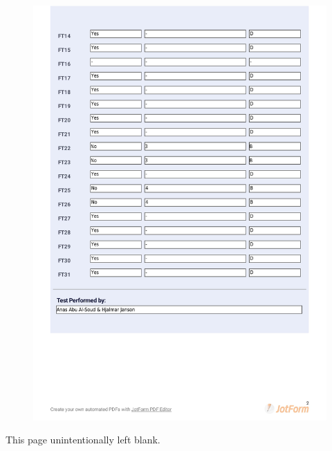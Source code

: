 \documentclass{article}
\begin{document}
 \begin{figure}
     \centering
     \includegraphics[width=13cm]{images/2021-03-04_Anas_ST3-2}
     \renewcommand\figurename{Figure}
     \label{fig:my_label}
 \end{figure}


\newpage
\begin{flushleft}
\end{flushleft}

\vspace*{\fill}
                \hfill
                \begin{center}
                This page unintentionally left blank.
                \end{center}
                \vspace{\fill}
                \thispagestyle{empty}

 \begin{figure}
     \centering
     \renewcommand\figurename{Figure}
     \label{fig:my_label}
 \end{figure}
 
\end{document}
